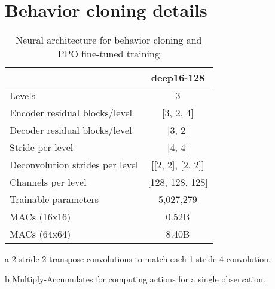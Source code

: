 \documentclass[conference,onecolumn]{IEEEtran}
\newcounter{supptable}
\newenvironment{supptable}
  {\renewcommand{\tablename}{Supplemental Table}\setcounter{table}{\value{supptable}}\addtocounter{supptable}{1}\begin{table}}
  {\end{table}\setcounter{supptable}{\value{table}}}
\begin{document}
\section{Behavior cloning details}
\label{appendix:behavior-cloning-details}
\begin{supptable}[H]
    \centering
    \begin{threeparttable}
    \caption{Neural architecture for behavior cloning and PPO fine-tuned training}
    \label{tab:bc-architecture}
    \begin{tabular}{lc}
    \toprule
                                 & deep16-128 \\
    \midrule
    Levels                      & 3  \\
    Encoder residual blocks/level & [3, 2, 4] \\
    Decoder residual blocks/level & [3, 2] \\
    Stride per level            & [4, 4] \\
    Deconvolution strides per level & [[2, 2], [2, 2]]\tnote{a}\\
    Channels per level          & [128, 128, 128] \\
    Trainable parameters        & 5,027,279 \\
    MACs\tnote{b} (16x16)          & 0.52B \\
    MACs\tnote{b} (64x64)          & 8.40B \\
    \bottomrule
    \end{tabular}
    \begin{tablenotes}
       \item[a] 2 stride-2 transpose convolutions to match each 1 stride-4 convolution.
       \item[b] Multiply-Accumulates for computing actions for a single observation.
    \end{tablenotes}
    \end{threeparttable}
\end{supptable}
\end{document}

